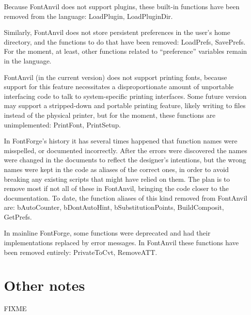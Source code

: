 Because FontAnvil does not support plugins, these built-in functions have
been removed from the language:  LoadPlugin, LoadPluginDir.

Similarly, FontAnvil does not store persistent preferences in the user's
home directory, and the functions to do that have been removed: LoadPrefs,
SavePrefs.  For the moment, at least, other functions related to
``preference'' variables remain in the language.

FontAnvil (in the current version) does not support printing fonts, because
support for this feature necessitates a disproportionate amount of
unportable interfacing code to talk to system-specific printing interfaces. 
Some future version may support a stripped-down and portable printing
feature, likely writing to files instead of the physical printer, but for
the moment, these functions are unimplemented:  PrintFont, PrintSetup.

In FontForge's history it has several times happened that function names
were misspelled, or documented incorrectly.  After the errors were
discovered the names were changed in the documents to reflect the designer's
intentions, but the wrong names were kept in the code as aliases of the
correct ones, in order to avoid breaking any existing scripts that might
have relied on them.  The plan is to remove most if not all of these in
FontAnvil, bringing the code closer to the documentation.  To date, the
function aliases of this kind removed from FontAnvil are: bAutoCounter,
bDontAutoHint, bSubstitutionPoints, BuildComposit, GetPrefs.

In mainline FontForge, some functions were deprecated and had their
implementations replaced by error messages.  In FontAnvil these functions
have been removed entirely:  PrivateToCvt, RemoveATT.

\section{Other notes}

FIXME

